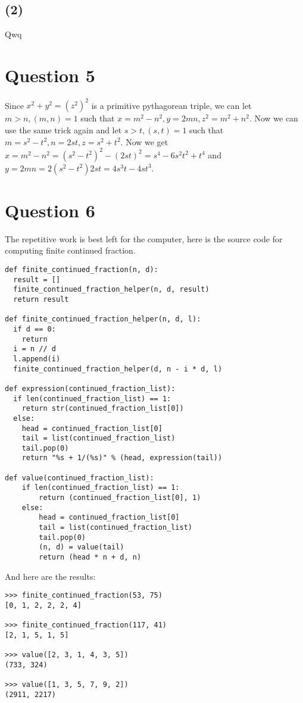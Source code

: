 \documentclass{article}
\begin{document}
\subsection*{(2)}
Qwq

\section*{Question 5}
Since $ x^2 + y^2 = (z^2)^2 $ is a primitive pythagorean triple, we can let $ m > n, (m, n) = 1 $ such that $ x = m^2 - n^2, y = 2mn, z^2 = m^2 + n^2 $. Now we can use the same trick again and let $ s > t, (s, t) = 1 $ such that $ m = s^2 - t^2, n = 2st, z = s^2 + t^2 $. Now we get $ x = m^2 - n^2 = (s^2 - t^2)^2 - (2st)^2 = s^4 - 6s^2t^2 + t^4 $ and $ y = 2mn = 2(s^2 - t^2)2st = 4s^3t - 4st^3 $.

\section*{Question 6}
The repetitive work is best left for the computer, here is the source code for computing finite continued fraction.
\begin{verbatim}
def finite_continued_fraction(n, d):
  result = []
  finite_continued_fraction_helper(n, d, result)
  return result

def finite_continued_fraction_helper(n, d, l):
  if d == 0:
    return
  i = n // d
  l.append(i)
  finite_continued_fraction_helper(d, n - i * d, l)

def expression(continued_fraction_list):
  if len(continued_fraction_list) == 1:
    return str(continued_fraction_list[0])
  else:
    head = continued_fraction_list[0]
    tail = list(continued_fraction_list)
    tail.pop(0)
    return "%s + 1/(%s)" % (head, expression(tail))

def value(continued_fraction_list):
    if len(continued_fraction_list) == 1:
        return (continued_fraction_list[0], 1)
    else:
        head = continued_fraction_list[0]
        tail = list(continued_fraction_list)
        tail.pop(0)
        (n, d) = value(tail)
        return (head * n + d, n)
\end{verbatim}

And here are the results:
\begin{verbatim}
>>> finite_continued_fraction(53, 75)
[0, 1, 2, 2, 2, 4]

>>> finite_continued_fraction(117, 41)
[2, 1, 5, 1, 5]

>>> value([2, 3, 1, 4, 3, 5])
(733, 324)

>>> value([1, 3, 5, 7, 9, 2])
(2911, 2217)
\end{verbatim}
\end{document}
